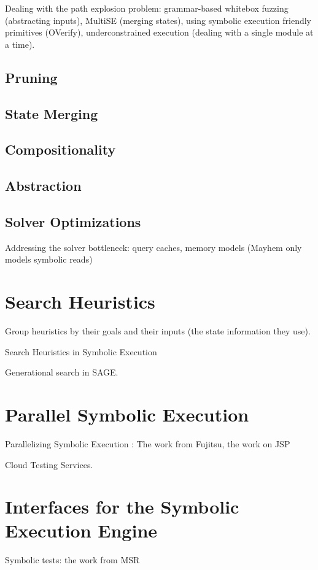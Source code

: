Dealing with the path explosion problem: grammar-based whitebox fuzzing (abstracting inputs), MultiSE (merging states), using symbolic execution friendly primitives (OVerify), underconstrained execution (dealing with a single module at a time).

\subsection{Pruning}

\subsection{State Merging}

\subsection{Compositionality}

\subsection{Abstraction}

\subsection{Solver Optimizations}

Addressing the solver bottleneck: query caches, memory models (Mayhem only models symbolic reads)


\section{Search Heuristics}
\label{sec:relwork:heuristics}

Group heuristics by their goals and their inputs (the state information they use).

Search Heuristics in Symbolic Execution

Generational search in SAGE.


\section{Parallel Symbolic Execution}
\label{sec:relwork:parallel}

Parallelizing Symbolic Execution : The work from Fujitsu, the work on JSP

Cloud Testing Services.


\section{Interfaces for the Symbolic Execution Engine}
\label{sec:relwork:ifaces}

Symbolic tests: the work from MSR


